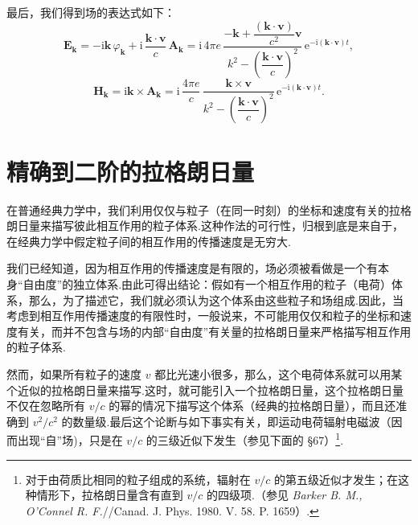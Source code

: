 \begin{xiti}
最后，我们得到场的表达式如下：
\begin{equation*}
  \boldsymbol{E}_{\boldsymbol{k}}
  =-\mathrm{i}\boldsymbol{k}\,\varphi_{\boldsymbol{k}}
  +\mathrm{i}\,\frac{\boldsymbol{k}\cdot\boldsymbol{v}}{c}\,
  \boldsymbol{A}_{\boldsymbol{k}}
  =\mathrm{i}\,4\pi e\,
  \frac{-\boldsymbol{k}+\dfrac{(\boldsymbol{k}\cdot\boldsymbol{v})}{c^2}\boldsymbol{v}}
       {k^2-\left(\dfrac{\boldsymbol{k}\cdot\boldsymbol{v}}{c}\right)^2}
  \,\mathrm{e}^{-\mathrm{i}(\boldsymbol{k}\cdot\boldsymbol{v})t},
\end{equation*}
\begin{equation*}
  \boldsymbol{H}_{\boldsymbol{k}}
  =\mathrm{i}\boldsymbol{k}\times\boldsymbol{A}_{\boldsymbol{k}}
  =\mathrm{i}\,\frac{4\pi e}{c}\,
  \frac{\boldsymbol{k}\times\boldsymbol{v}}
       {k^2-\left(\dfrac{\boldsymbol{k}\cdot\boldsymbol{v}}{c}\right)^2}
  \,\mathrm{e}^{-\mathrm{i}(\boldsymbol{k}\cdot\boldsymbol{v})t}.
\end{equation*}

\end{xiti}

\section{精确到二阶的拉格朗日量}

在普通经典力学中，我们利用仅仅与粒子（在同一时刻）的坐标和速度有关的拉格朗日量来描写彼此相互作用的粒子体系.这种作法的可行性，归根到底是来自于，在经典力学中假定粒子间的相互作用的传播速度是无穷大.

我们已经知道，因为相互作用的传播速度是有限的，场必须被看做是一个有本身“自由度”的独立体系.由此可得出结论：假如有一个相互作用的粒子（电荷）体系，那么，为了描述它，我们就必须认为这个体系由这些粒子和场组成.因此，当考虑到相互作用传播速度的有限性时，一般说来，不可能用仅仅和粒子的坐标和速度有关，而并不包含与场的内部“自由度”有关量的拉格朗日量来严格描写相互作用的粒子体系.

然而，如果所有粒子的速度 $v$ 都比光速小很多，那么，这个电荷体系就可以用某个近似的拉格朗日量来描写.这时，就可能引入一个拉格朗日量，这个拉格朗日量不仅在忽略所有 $v/c$ 的幂的情况下描写这个体系（经典的拉格朗日量），而且还准确到 $v^2/c^2$ 的数量级.最后这个论断与如下事实有关，即运动电荷辐射电磁波（因而出现“自”场)，只是在 $v/c$ 的三级近似下发生（参见下面的 §67）\footnote{对于由荷质比相同的粒子组成的系统，辐射在 $v/c$ 的第五级近似才发生；在这种情形下，拉格朗日量含有直到 $v/c$ 的四级项.（参见 \textit{Barker B. M., O'Connel R. F.}//Canad. J. Phys. 1980. V. 58. P. 1659）.}.

